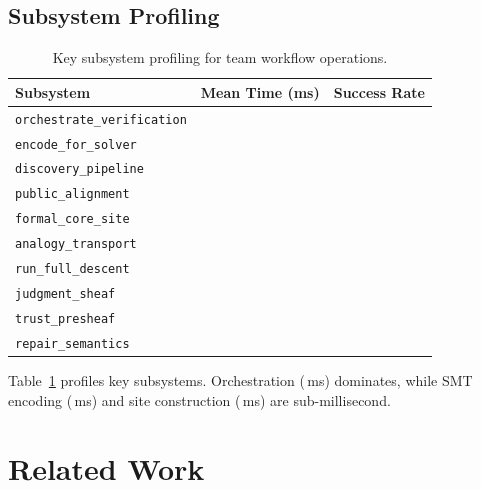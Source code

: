 \documentclass[11pt]{article}
\begin{document}
\subsection{Subsystem Profiling}

\begin{table}[t]
\centering
\caption{Key subsystem profiling for team workflow operations.}
\label{tab:subsystem-profile}
\begin{tabular}{lrr}
\toprule
\textbf{Subsystem} & \textbf{Mean Time (ms)} & \textbf{Success Rate} \\
\midrule
\texttt{orchestrate\_verification} & \compProfOrchestrateVerificationMeanMs{}
  & \compProfOrchestrateVerificationRate{} \\
\texttt{encode\_for\_solver} & \compProfEncodeForSolverMeanMs{}
  & \compProfEncodeForSolverRate{} \\
\texttt{discovery\_pipeline} & \compProfDiscoveryPipelineMeanMs{}
  & \compProfDiscoveryPipelineRate{} \\
\texttt{public\_alignment} & \compProfPublicAlignmentMeanMs{}
  & \compProfPublicAlignmentRate{} \\
\texttt{formal\_core\_site} & \compProfFormalCoreSiteMeanMs{}
  & \compProfFormalCoreSiteRate{} \\
\texttt{analogy\_transport} & \compProfAnalogyTransportMeanMs{}
  & \compProfAnalogyTransportRate{} \\
\texttt{run\_full\_descent} & \compProfRunFullDescentMeanMs{}
  & \compProfRunFullDescentRate{} \\
\texttt{judgment\_sheaf} & \compProfJudgmentSheafMeanMs{}
  & \compProfJudgmentSheafRate{} \\
\texttt{trust\_presheaf} & \compProfTrustPresheafMeanMs{}
  & \compProfTrustPresheafRate{} \\
\texttt{repair\_semantics} & \compProfRepairSemanticsMeanMs{}
  & \compProfRepairSemanticsRate{} \\
\bottomrule
\end{tabular}
\end{table}

Table~\ref{tab:subsystem-profile} profiles key subsystems. Orchestration
(\compProfOrchestrateVerificationMeanMs{}\,ms) dominates, while SMT encoding
(\compProfEncodeForSolverMeanMs{}\,ms) and site construction
(\compProfFormalCoreSiteMeanMs{}\,ms) are sub-millisecond.

\section{Related Work}\label{sec:related}
\end{document}
